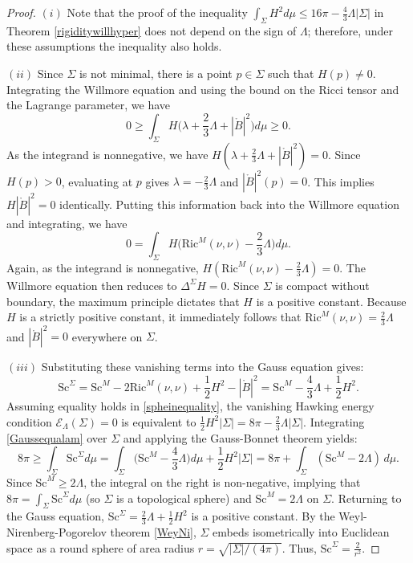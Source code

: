 \documentclass[12pt,a4paper]{amsart}
\theoremstyle{plain}
\theoremstyle{definition}
\begin{document}
\begin{proof}
$(i)$ Note that the proof of the inequality $\int_\Sigma H^2 d\mu \le 16\pi - \frac{4}{3}\Lambda|\Sigma|$ in Theorem \ref{rigiditywillhyper} does not depend on the sign of $\Lambda$; therefore, under these assumptions the inequality also holds.

$(ii)$ Since $\Sigma$ is not minimal,  there is a point $p \in \Sigma$ such that $H(p)\neq 0$. Integrating the Willmore equation and using the bound on the Ricci tensor and the Lagrange parameter, we have
$$0\geq \int_\Sigma H\Big(\lambda + \frac{2}{3}\Lambda +|\mathring{B}|^2 \Big) d\mu\geq 0.$$
As the integrand is nonnegative, we have $H(\lambda + \frac{2}{3}\Lambda +|\mathring{B}|^2 )=0$. Since $H(p) > 0$, evaluating at $p$ gives $\lambda = - \frac{2}{3}\Lambda$ and $|\mathring{B}|^2(p)=0$. This implies $H |\mathring{B}|^2=0$ identically. Putting this information back into the Willmore equation and integrating, we have 
$$0= \int_\Sigma H\Big( \mathrm{Ric}^M(\nu, \nu) - \frac{2}{3}\Lambda \Big) d\mu.$$
Again, as the integrand is nonnegative, $H( \mathrm{Ric}^M(\nu, \nu) - \frac{2}{3}\Lambda )=0$. The Willmore equation then reduces to $\Delta^\Sigma H =0$. Since $\Sigma$ is compact without boundary, the maximum principle dictates that $H$ is a positive constant. Because $H$ is a strictly positive constant, it immediately follows that $\mathrm{Ric}^M(\nu, \nu) = \frac{2}{3}\Lambda$ and $|\mathring{B}|^2=0$ everywhere on $\Sigma$. 

 $(iii)$ Substituting these vanishing terms into the Gauss equation gives:
\begin{equation}\label{Gaussequalam}
    \mathrm{Sc}^{\Sigma} = \mathrm{Sc}^{M} - 2\mathrm{Ric}^M(\nu, \nu) + \frac{1}{2}H^2 - |\mathring{B}|^2 = \mathrm{Sc}^{M} - \frac{4}{3}\Lambda + \frac{1}{2}H^2.
\end{equation}
Assuming equality holds in \eqref{spheinequality}, the vanishing Hawking energy condition $\mathcal{E}_\Lambda(\Sigma) = 0$ is equivalent to $\frac{1}{2}H^2 |\Sigma| = 8\pi - \frac{2}{3}\Lambda|\Sigma|$. Integrating \eqref{Gaussequalam} over $\Sigma$ and applying the Gauss-Bonnet theorem yields:
$$8\pi  \geq \int_\Sigma \mathrm{Sc}^{\Sigma} d\mu = \int_\Sigma \Big(\mathrm{Sc}^{M} -  \frac{4}{3}\Lambda\Big) d\mu + \frac{1}{2}H^2|\Sigma| = 8\pi + \int_\Sigma (\mathrm{Sc}^{M} - 2\Lambda) \, d\mu.$$
Since $\mathrm{Sc}^{M} \geq 2\Lambda$, the integral on the right is non-negative, implying that $8\pi  =\int_\Sigma \mathrm{Sc}^{\Sigma} d\mu $ (so $\Sigma$ is a topological sphere) and $\mathrm{Sc}^{M} = 2\Lambda$ on $\Sigma$. Returning to the Gauss equation, $\mathrm{Sc}^{\Sigma} = \frac{2}{3}\Lambda + \frac{1}{2}H^2$ is a positive constant. By the Weyl-Nirenberg-Pogorelov theorem \ref{WeyNi}, $\Sigma$ embeds isometrically into Euclidean space as a round sphere of area radius $r = \sqrt{|\Sigma|/(4\pi)}$. Thus, $\mathrm{Sc}^\Sigma = \frac{2}{r^2}$.


\end{proof}
\end{document}
